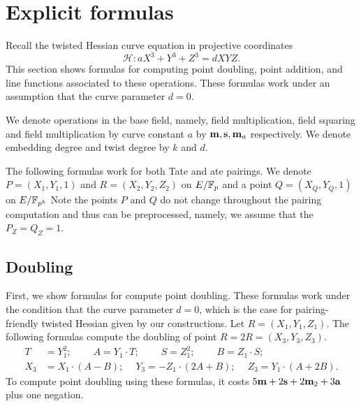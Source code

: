 \section{Explicit formulas}
\label{sec:formulas}

Recall the twisted Hessian curve equation in projective coordinates
$$ \mathcal{H}: a X^3 + Y^3 + Z^3 = d X Y Z. $$
This section shows formulas for computing point doubling, point addition, and line functions associated to these operations.
These formulas work under an assumption that the curve parameter $d = 0$.

We denote operations in the base field, namely, 
field multiplication, field squaring and field multiplication by curve constant $a$
by $\textbf{m}, \textbf{s}, \textbf{m}_{a}$ respectively.
We denote embedding degree and twist degree by $k$ and $d$.

The following formulas work for both Tate and ate pairings.
We denote
$P = (X_1,Y_1,1)$ and $R = (X_2,Y_2,Z_2)$ on $E/\mathbb{F}_{p}$ and a point $Q = (X_Q,Y_Q,1)$ on $E/\mathbb{F}_{p^{k}}$
Note the points $P$ and $Q$ do not change throughout the pairing computation and thus can be preprocessed,
namely, we assume that the $P_Z = Q_Z = 1$.



\subsection{Doubling}
First, we show formulas for compute point doubling.
These formulas work under the condition that the curve parameter $d=0$,
which is the case for pairing-friendly twisted Hessian given by our constructions.
Let $R = (X_1, Y_1, Z_1)$.
The following formulas compute the doubling of point $R = 2R = (X_3,Y_3,Z_3)$.
\begin{align*}
T &= Y_1^2;\	\qquad	A = Y_1 \cdot T;\	\qquad
S = Z_1 ^ 2;\	\qquad	B = Z_1 \cdot S;\\
X_3 &= X_1 \cdot (A - B);\	\quad
Y_3 = -Z_1 \cdot (2A + B);\	\quad
Z_3 = Y_1 \cdot (A + 2B).
\end{align*}
To compute point doubling using these formulas,
it costs $5\textbf{m} + 2\textbf{s} + 2\textbf{m}_{2} + 3\textbf{a}$ plus one negation.

